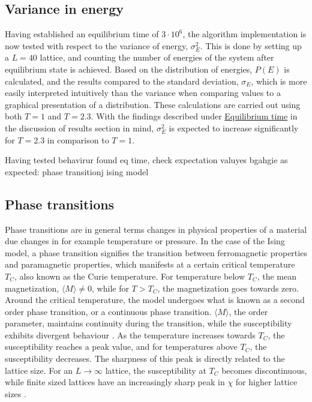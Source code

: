 \documentclass[%
oneside,                 %
final,                   %
10pt]{article}
\begin{document}
 
\subsection{Variance in energy}
\label{SS:M.variance}
Having established an equilibrium time of $3 \cdot 10^6$, the algorithm implementation is now tested with respect to the variance of energy,  $\sigma_E^2$. This is done by setting up a $L=40$ lattice, and counting the number of energies of the system after equilibrium state is achieved. Based on the distribution of energies, $P(E)$ is calculated, and the results compared to the standard deviation, $\sigma_E$, which is more easily interpreted intuitively than the variance when comparing values to a graphical presentation of a distribution. These calculations are carried out using both $T=1$ and $T=2.3$. With the findings described under \hyperref[SS:Disucssion_eqtime]{Equilibrium time} in the discussion of results section in mind, $\sigma_E^2$ is expected to increase significantly for $T=2.3$ in comparison to $T=1$.

Having tested behavirur found eq time, check expectation valuyes bgahgie as expected: phase transitionj ising model

 
\subsection{Phase transitions}
\label{SS.M.Phase_trans}
Phase transitions are in general terms changes in physical properties of a material due changes in for example temperature or pressure. In the case of the Ising model, a phase transition signifies the transition between ferromagnetic properties and paramagnetic properties, which manifests at a certain critical temperature $T_C$, also known as the Curie temperature. For temperature below $T_C$, the mean magnetization, $\langle M \rangle \neq 0$, while for $T>T_C$, the magnetization goes towards zero. Around the critical temperature, the model undergoes what is known as a second order phase transition, or a continuous phase transition. $\langle M \rangle$, the order parameter, maintains continuity during the transition, while the susceptibility exhibits divergent behaviour \cite{Fitzpatrick}. As the temperature increases towards $T_C$, the susceptibility reaches a peak value, and for temperatures above $T_C$, the susceptibility decreases. The sharpness of this peak is directly related to the lattice size. For an $L \rightarrow \infty$ lattice, the susceptibility at $T_C$ becomes discontinuous, while finite sized lattices have an increasingly sharp peak in $\chi $ for higher lattice sizes \cite{HJ-SP}. \newline
\end{document}
